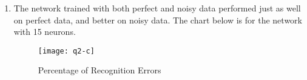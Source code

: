 \documentclass[11pt]{article}
\begin{document}
\begin{enumerate}
\begin{enumerate}
\item The network trained with both perfect and noisy data performed just as well on perfect data, and better on noisy data. The chart below is for the network with 15 neurons.\\
\begin{figure}[h!]
    \centering
     \texttt{[image: q2-c]}
        \caption{Percentage of Recognition Errors}
\end{figure}

\end{enumerate}

\end{enumerate}
\end{document}
